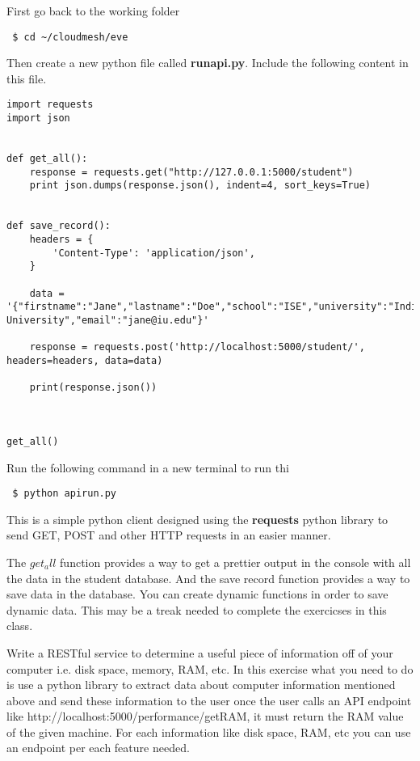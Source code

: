 First go back to the working folder
\begin{lstlisting}
 $ cd ~/cloudmesh/eve
\end{lstlisting}

Then create a new python file called \textbf{runapi.py}. Include the
following content in this file.

\begin{lstlisting}
import requests
import json


def get_all():
    response = requests.get("http://127.0.0.1:5000/student")
    print json.dumps(response.json(), indent=4, sort_keys=True)


def save_record():
    headers = {
        'Content-Type': 'application/json',
    }

    data = '{"firstname":"Jane","lastname":"Doe","school":"ISE","university":"Indiana University","email":"jane@iu.edu"}'

    response = requests.post('http://localhost:5000/student/', headers=headers, data=data)

    print(response.json())



get_all()
\end{lstlisting}

Run the following command in a new terminal to run thi

\begin{lstlisting}
 $ python apirun.py
\end{lstlisting}

This is a simple python client designed using the \textbf{requests} python
library to send GET, POST and other HTTP requests in an easier manner.

The $get_all$ function provides a way to get a prettier output in the
console with all the data in the student database. And the save record
function provides a way to save data in the database. You can create
dynamic functions in order to save dynamic data. This may be a treak
needed to complete the exercicses in this class.

\begin{exercise}
Write a RESTful service to determine a useful piece of information off
of your computer i.e. disk space, memory, RAM, etc. In this exercise what
you need to do is use a python library to extract data about computer
information mentioned above and send these information to the user once
the user calls an API endpoint like http://localhost:5000/performance/getRAM,
it must return the RAM value of the given machine. For each information like
disk space, RAM, etc you can use an endpoint per each feature needed. 
\end{exercise}

